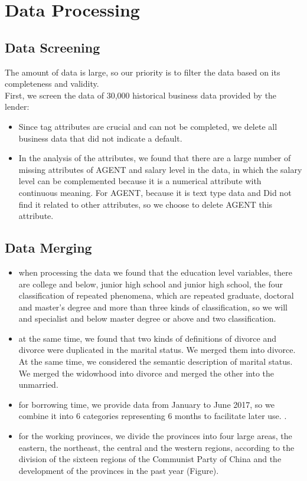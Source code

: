 \documentclass{mcmthesis}
\begin{document}
\section{Data Processing}
\subsection{Data Screening}
The amount of data is large, so our priority is to filter the data based on its completeness and validity.\\
First, we screen the data of 30,000 historical business data provided by the lender:\\
\begin{itemize}
\item Since tag attributes are crucial and can not be completed, we delete all business data that did not indicate a default.
\item In the analysis of the attributes, we found that there are a large number of missing attributes of AGENT and salary level in the data, in which the salary level can be complemented because it is a numerical attribute with continuous meaning. For AGENT, because it is text type data and Did not find it related to other attributes, so we choose to delete AGENT this attribute.
\end{itemize}

\subsection{Data Merging}
\begin{itemize}
\item when processing the data we found that the education level variables, there are college and below, junior high school and junior high school, the four classification of repeated phenomena, which are repeated graduate, doctoral and master's degree and more than three kinds of classification, so we will and specialist and below master degree or above and two classification.
\item at the same time, we found that two kinds of definitions of divorce and divorce were duplicated in the marital status. We merged them into divorce. At the same time, we considered the semantic description of marital status. We merged the widowhood into divorce and merged the other into the unmarried.
\item for borrowing time, we provide data from January to June 2017, so we combine it into 6 categories representing 6 months to facilitate later use. .
\item for the working provinces, we divide the provinces into four large areas, the eastern, the northeast, the central and the western regions, according to the division of the sixteen regions of the Communist Party of China and the development of the provinces in the past year (Figure).
\end{itemize}
\end{document}

